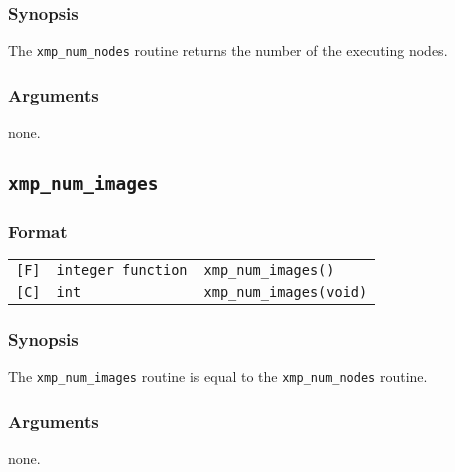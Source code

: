 \subsubsection*{Synopsis}
The {\tt xmp\_num\_nodes} routine returns the number of the executing nodes.

\subsubsection*{Arguments}
none.

\subsection{\tt xmp\_num\_images}\label{sub:xmpnumimages}

\subsubsection*{Format}

\begin{tabular}{lll}
\verb![F]!&  {\tt integer function}& {\tt xmp\_num\_images()}\\
\verb![C]!&  {\tt int}& {\tt xmp\_num\_images(void)}
\end{tabular}

\subsubsection*{Synopsis}
The {\tt xmp\_num\_images} routine is equal to the {\tt xmp\_num\_nodes} routine.

\subsubsection*{Arguments}
none.

%
%
%
%
%


